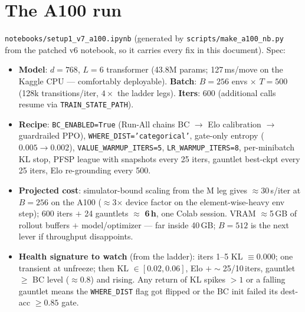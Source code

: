 \documentclass[11pt]{article}
\newcommand{\cd}[1]{\texttt{#1}}
\begin{document}
\section{The A100 run}\label{v7:a100}
\cd{notebooks/setup1\_v7\_a100.ipynb} (generated by \cd{scripts/make\_a100\_nb.py} from the
patched v6 notebook, so it carries every fix in this document). Spec:
\begin{itemize}[leftmargin=2em]
\item \textbf{Model}: $d{=}768$, $L{=}6$ transformer (43.8M params; 127\,ms/move on the Kaggle
CPU --- comfortably deployable). \textbf{Batch}: $B{=}256$ envs $\times$ $T{=}500$ (128k
transitions/iter, $4\times$ the ladder legs). \textbf{Iters}: 600 (additional calls resume via
\cd{TRAIN\_STATE\_PATH}).
\item \textbf{Recipe}: \cd{BC\_ENABLED=True} (Run-All chains BC $\to$ Elo calibration $\to$
guardrailed PPO), \cd{WHERE\_DIST='categorical'}, gate-only entropy ($0.005\!\to\!0.002$),
\cd{VALUE\_WARMUP\_ITERS=5}, \cd{LR\_WARMUP\_ITERS=8}, per-minibatch KL stop, PFSP league with
snapshots every 25 iters, gauntlet best-ckpt every 25 iters, Elo re-grounding every 500.
\item \textbf{Projected cost}: simulator-bound scaling from the M leg gives $\approx$30\,s/iter
at $B{=}256$ on the A100 ($\approx$3$\times$ device factor on the element-wise-heavy env step);
600 iters $+$ 24 gauntlets $\approx$ \textbf{6\,h}, one Colab session. VRAM $\approx$5\,GB of
rollout buffers $+$ model/optimizer --- far inside 40\,GB; $B{=}512$ is the next lever if
throughput disappoints.
\item \textbf{Health signature to watch} (from the ladder): iters 1--5 KL $\equiv 0.000$; one
transient at unfreeze; then KL $\in[0.02, 0.06]$, Elo $+\sim$25/10\,iters, gauntlet $\ge$ BC level
($\approx$0.8) and rising. Any return of KL spikes $>1$ or a falling gauntlet means the
\cd{WHERE\_DIST} flag got flipped or the BC init failed its dest-acc $\ge 0.85$ gate.
\end{itemize}
\end{document}
